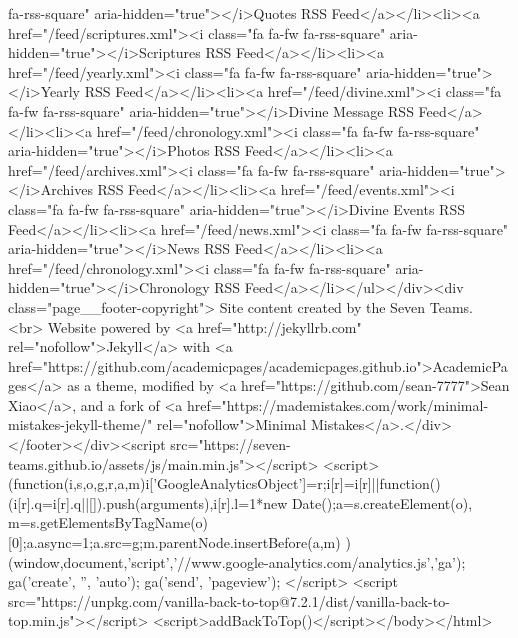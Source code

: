 fa-rss-square" aria-hidden="true"></i>Quotes RSS Feed</a></li><li><a href="/feed/scriptures.xml"><i class="fa fa-fw fa-rss-square" aria-hidden="true"></i>Scriptures RSS Feed</a></li><li><a href="/feed/yearly.xml"><i class="fa fa-fw fa-rss-square" aria-hidden="true"></i>Yearly RSS Feed</a></li><li><a href="/feed/divine.xml"><i class="fa fa-fw fa-rss-square" aria-hidden="true"></i>Divine Message RSS Feed</a></li><li><a href="/feed/chronology.xml"><i class="fa fa-fw fa-rss-square" aria-hidden="true"></i>Photos RSS Feed</a></li><li><a href="/feed/archives.xml"><i class="fa fa-fw fa-rss-square" aria-hidden="true"></i>Archives RSS Feed</a></li><li><a href="/feed/events.xml"><i class="fa fa-fw fa-rss-square" aria-hidden="true"></i>Divine Events RSS Feed</a></li><li><a href="/feed/news.xml"><i class="fa fa-fw fa-rss-square" aria-hidden="true"></i>News RSS Feed</a></li><li><a href="/feed/chronology.xml"><i class="fa fa-fw fa-rss-square" aria-hidden="true"></i>Chronology RSS Feed</a></li></ul></div><div class="page__footer-copyright"> Site content created by the Seven Teams. <br> Website powered by <a href="http://jekyllrb.com" rel="nofollow">Jekyll</a> with <a href="https://github.com/academicpages/academicpages.github.io">AcademicPages</a> as a theme, modified by <a href="https://github.com/sean-7777">Sean Xiao</a>, and a fork of <a href="https://mademistakes.com/work/minimal-mistakes-jekyll-theme/" rel="nofollow">Minimal Mistakes</a>.</div></footer></div><script src="https://seven-teams.github.io/assets/js/main.min.js"></script> <script> (function(i,s,o,g,r,a,m){i['GoogleAnalyticsObject']=r;i[r]=i[r]||function(){ (i[r].q=i[r].q||[]).push(arguments)},i[r].l=1*new Date();a=s.createElement(o), m=s.getElementsByTagName(o)[0];a.async=1;a.src=g;m.parentNode.insertBefore(a,m) })(window,document,'script','//www.google-analytics.com/analytics.js','ga'); ga('create', '', 'auto'); ga('send', 'pageview'); </script> <script src="https://unpkg.com/vanilla-back-to-top@7.2.1/dist/vanilla-back-to-top.min.js"></script> <script>addBackToTop()</script></body></html>
